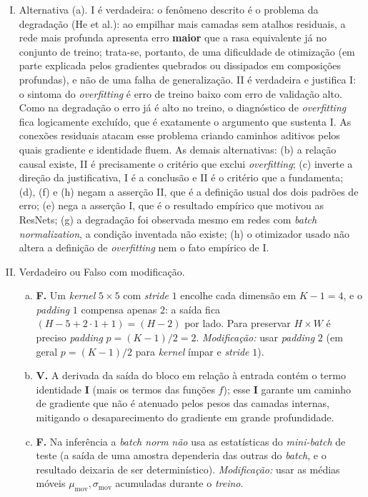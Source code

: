 \documentclass{dlproblemset}
\begin{document}
\begin{enumerate}[I)]
    \item Alternativa (a). I é verdadeira: o fenômeno descrito é o problema da degradação (He et al.): ao empilhar mais camadas sem atalhos residuais, a rede mais profunda apresenta erro \textbf{maior} que a rasa equivalente já no conjunto de treino; trata-se, portanto, de uma dificuldade de otimização (em parte explicada pelos gradientes quebrados ou dissipados em composições profundas), e não de uma falha de generalização. II é verdadeira e justifica I: o sintoma do \textit{overfitting} é erro de treino baixo com erro de validação alto. Como na degradação o erro já é alto no treino, o diagnóstico de \textit{overfitting} fica logicamente excluído, que é exatamente o argumento que sustenta I. As conexões residuais atacam esse problema criando caminhos aditivos pelos quais gradiente e identidade fluem. As demais alternativas: (b) a relação causal existe, II é precisamente o critério que exclui \textit{overfitting}; (c) inverte a direção da justificativa, I é a conclusão e II é o critério que a fundamenta; (d), (f) e (h) negam a asserção II, que é a definição usual dos dois padrões de erro; (e) nega a asserção I, que é o resultado empírico que motivou as ResNets; (g) a degradação foi observada mesmo em redes com \textit{batch normalization}, a condição inventada não existe; (h) o otimizador usado não altera a definição de \textit{overfitting} nem o fato empírico de I.

    \item Verdadeiro ou Falso com modificação.
    \begin{enumerate}[a)]
        \item \textbf{F.} Um \textit{kernel} $5\times 5$ com \textit{stride} $1$ encolhe cada dimensão em $K - 1 = 4$, e o \textit{padding} $1$ compensa apenas $2$: a saída fica $(H - 5 + 2\cdot 1 + 1) = (H - 2)$ por lado. Para preservar $H\times W$ é preciso \textit{padding} $p = (K-1)/2 = 2$. \textit{Modificação:} usar \textit{padding} $2$ (em geral $p = (K-1)/2$ para \textit{kernel} ímpar e \textit{stride} $1$).

        \item \textbf{V.} A derivada da saída do bloco em relação à entrada contém o termo identidade $\mathbf{I}$ (mais os termos das funções $f$); esse $\mathbf{I}$ garante um caminho de gradiente que não é atenuado pelos pesos das camadas internas, mitigando o desaparecimento do gradiente em grande profundidade.

        \item \textbf{F.} Na inferência a \textit{batch norm} \emph{não} usa as estatísticas do \textit{mini-batch} de teste (a saída de uma amostra dependeria das outras do \textit{batch}, e o resultado deixaria de ser determinístico). \textit{Modificação:} usar as médias móveis $\mu_{\text{mov}}, \sigma_{\text{mov}}$ acumuladas durante o \emph{treino}.


\end{enumerate}
\end{enumerate}
\end{document}
